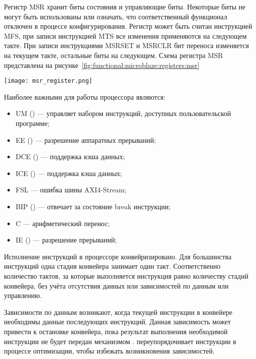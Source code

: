 Регистр MSR хранит биты состояния и управляющие биты. Некоторые биты не могут быть использованы
или означать, что соответственный функционал отключен в процессе конфигурирования. Регистр может
быть считан инструкцией MFS, при записи инструкцией MTS все изменения применяются на следующем такте.
При записи инструкциями MSRSET и MSRCLR бит переноса изменяется на текущем такте, остальные биты
на следующем. Схема регистра MSR представлена на рисунке~\ref{fig:functional:microblaze:registers:msr}

\begin{center}
  \centering
  \texttt{[image: msr\_register.png]}
  \label{fig:functional:microblaze:registers:msr}
\end{center}

Наиболее важными для работы процессора являются:
\begin{itemize}
  \item UM () --- управляет набором инструкций, доступных пользовательской программе;
  \item EE () --- разрешение аппаратных прерываний;
  \item DCE () --- поддержка кэша данных;
  \item ICE () --- поддержка кэша данных;
  \item FSL --- ошибка шины AXI4-Stream;
  \item BIP () --- отвечает за состояние break инструкции;
  \item C  --- арифметический перенос;
  \item IE ()  --- разрешение прерываний;
\end{itemize}

Исполнение инструкций в процессоре конвейризировано. Для большинства инструкций одна стадия
конвейера занимает один такт. Соответственно количество тактов, за которые выполняется инструкция
равно количеству стадий конвейера, без учёта отсутствия данных или зависимостей по данным или управлению.

Зависимости по данным возникают, когда текущей инструкции в конвейере необходимы данные последующих инструкций.
Данная зависимость может привести к остановке конвейера, пока результат выполнения необходимой инструкции
не будет передан механизмом .  переупорядочивает инструкции в процессе
оптимизации, чтобы избежать возникновения зависимостей.

